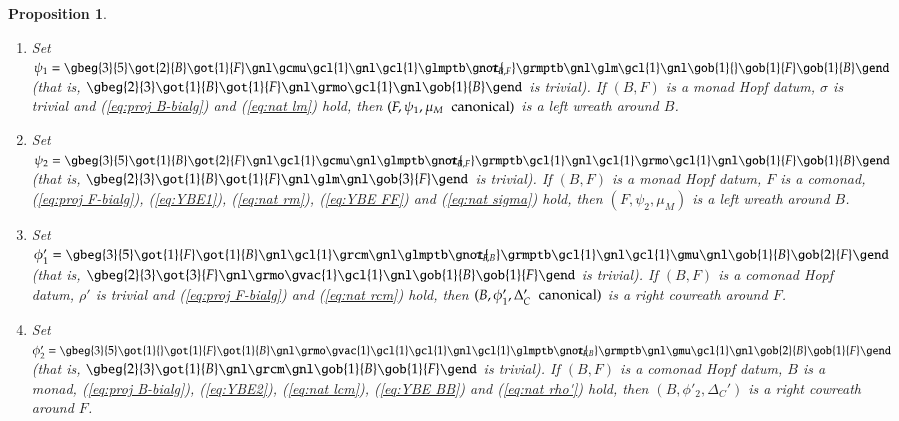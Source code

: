 \documentclass[a4paper, 12pt]{article}
\renewcommand{\_}[1]{\mbox{$_{\left( #1 \right)}$}}
\theoremstyle{plain}
\newtheorem{prop}[thm]{Proposition}
\newcommand{\equref}[1]{(\ref{eq:#1})}
\newcommand{\prlabel}[1]{\label{pr:#1}}
\begin{document}
\begin{prop} \prlabel{psi_1,2}
\begin{enumerate}
\item Set $\psi_1=
\gbeg{3}{5}
\got{2}{B} \got{1}{F} \gnl
\gcmu \gcl{1} \gnl
\gcl{1}  \glmptb \gnot{\hspace{-0,34cm}\tau_{B,F}} \grmptb \gnl
\glm \gcl{1} \gnl
\gob{1}{} \gob{1}{F} \gob{1}{B} 
\gend$ (that is, 
$\gbeg{2}{3}
\got{1}{B} \got{1}{F} \gnl
\grmo \gcl{1} \gnl 
\gob{1}{B}
\gend$ is trivial). If $(B,F)$ is a monad Hopf datum, $\sigma$ is trivial and \equref{proj B-bialg} and \equref{nat lm} hold, 
then $(F, \psi_1, \mu_M \hspace{0,2cm}\textnormal{canonical})$ is a left wreath around $B$. 


\item Set $\psi_2=
\gbeg{3}{5}
\got{1}{B} \got{2}{F} \gnl
\gcl{1} \gcmu \gnl
\glmptb \gnot{\hspace{-0,34cm}\tau_{B,F}} \grmptb \gcl{1} \gnl
\gcl{1} \grmo \gcl{1} \gnl
\gob{1}{F} \gob{1}{B} 
\gend$ (that is, $\gbeg{2}{3}
\got{1}{B} \got{1}{F} \gnl
\glm \gnl 
\gob{3}{F}
\gend$ is trivial). If $(B,F)$ is a monad Hopf datum, $F$ is a comonad, \equref{proj F-bialg}, \equref{YBE1}, \equref{nat rm}, \equref{YBE FF} and \equref{nat sigma} hold, 
then $(F, \psi_2, \mu_M)$ is a left wreath around $B$. 


\item Set $\phi_1'= 
\gbeg{3}{5}
\got{1}{F} \got{1}{B} \gnl
\gcl{1} \grcm \gnl
\glmptb \gnot{\hspace{-0,34cm}\tau_{F,B}} \grmptb \gcl{1} \gnl
\gcl{1} \gmu \gnl
\gob{1}{B} \gob{2}{F} 
\gend$ (that is, $\gbeg{2}{3}
\got{3}{F} \gnl
\grmo \gvac{1} \gcl{1} \gnl 
\gob{1}{B} \gob{1}{F}
\gend$ is trivial). If $(B,F)$ is a comonad Hopf datum, $\rho'$ is trivial and \equref{proj F-bialg} and \equref{nat rcm} hold, 
then $(B, \phi'_1, \Delta_C' \hspace{0,2cm}\textnormal{canonical})$ is a right cowreath around $F$. 


\item Set $\phi'_2= 
\gbeg{3}{5}
\got{1}{} \got{1}{F} \got{1}{B} \gnl
\grmo \gvac{1} \gcl{1} \gcl{1} \gnl
\gcl{1} \glmptb \gnot{\hspace{-0,34cm}\tau_{F,B}} \grmptb \gnl
\gmu \gcl{1} \gnl
\gob{2}{B} \gob{1}{F} 
\gend$ (that is, $\gbeg{2}{3}
\got{1}{B} \gnl
\grcm \gnl  
\gob{1}{B} \gob{1}{F}
\gend$ is trivial). If $(B,F)$ is a comonad Hopf datum, $B$ is a monad, \equref{proj B-bialg}, \equref{YBE2}, \equref{nat lcm}, \equref{YBE BB} and \equref{nat rho'} hold, 
then $(B, \phi'_2, \Delta_C')$ is a right cowreath around $F$. 

\end{enumerate}
\end{prop}
\end{document}
